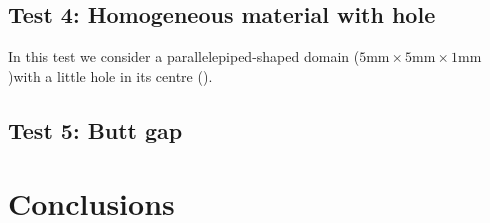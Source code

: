 \documentclass[11pt,a4paper]{article}
\begin{document}
\subsection{Test 4: Homogeneous material with hole}
In this test we consider a parallelepiped-shaped domain (\(5\mathrm{mm}\times 5\mathrm{mm}\times 1\mathrm{mm}\))with a little hole in its centre (\(\)).
\subsection{Test 5: Butt gap}

\section{Conclusions}
\end{document}
